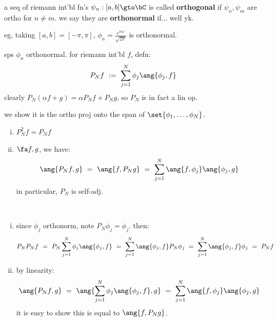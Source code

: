 \begin{defn}
	a seq of riemann int'bl fn's $\psi_{n}:[a,b]\gto\bC$ is called \textbf{orthogonal}
	if $\psi_{n},\psi_{m}$ are ortho for $n\neq m$.
	we say they are \textbf{orthonormal} if... well yk.
\end{defn}
eg, taking $[a,b]=[-\pi,\pi]$, $\phi_{n}=\frac{e^{inx}}{\sqrt{2\pi}}$ is
orthonormal.

\begin{defn}
	sps $\phi_{n}$ orthonormal. for riemann int'bl $f$, defn:
	\begin{equation*}
		P_{N}f \ := \ \sum_{j=1}^{N}\phi_{j}\ang{\phi_{j},f}
	\end{equation*}
	clearly $P_{N}(\alpha f+g)=\alpha P_{N}f+P_{N}g$, so $P_{N}$ is in fact a lin op.
\end{defn}
we show it is the ortho proj onto the span of $\set{\phi_{1},\dots,\phi_{N}}$.

\begin{lm} \vspace{-0.2in}
	\begin{enumerate}[i)]
		\item $P^{2}_{N}f=P_{N}f$
		\item $\fa f,g$, we have:
			\begin{equation*}
				\ang{P_{N}f,g} \ = \ \ang{f,P_{N}g} \ = \
				\sum_{j=1}^{N}\ang{f,\phi_{j}}\ang{\phi_{j},g}
			\end{equation*}
			in particular, $P_{N}$ is self-adj.
	\end{enumerate}
\end{lm} \

\begin{pf} \vspace{-0.2in}
	\begin{enumerate}[i)]
		\item since $\phi_{j}$ orthonorm, note $P_{N}\phi_{j}=\phi_{j}$. then:
			\begin{equation*}
				P_{N}P_{N}f
				\ = \ P_{N}\sum_{j=1}^{N}\phi_{j}\ang{\phi_{j},f}
				\ = \ \sum_{j=1}^{N}\ang{\phi_{j},f}P_{N}\phi_{j}
				\ = \ \sum_{j=1}^{N}\ang{\phi_{j},f}\phi_{j}
				\ = \ P_{N}f
			\end{equation*}
		\item by linearity:
			\begin{equation*}
				\ang{P_{N}f,g}
				\ = \ \ang{\sum_{j=1}^{N}\phi_{j}\ang{\phi_{j},f},g}
				\ = \ \sum_{j=1}^{N}\ang{f,\phi_{j}}\ang{\phi_{j},g}
			\end{equation*}
			it is easy to show this is equal to $\ang{f,P_{N}g}$.
	\end{enumerate}
\end{pf} \

